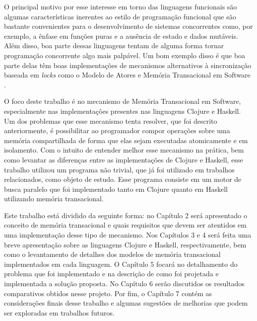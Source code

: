 O principal motivo por esse interesse em torno das linguagens funcionais são algumas características inerentes ao estilo de programação funcional que são bastante convenientes para o desenvolvimento de sistemas concorrentes como, por exemplo, a ênfase em funções puras e a ausência de estado e dados mutáveis. Além disso, boa parte dessas linguagens tentam de alguma forma tornar programação concorrente algo mais palpável. Um bom exemplo disso é que boa parte delas têm boas implementações de mecanismos alternativos à sincronização baseada em \emph{locks} como o Modelo de Atores \cite{agha1986actors} e Memória Transacional em Software \cite{shavit1995software}.

O foco deste trabalho é no mecanismo de Memória Transacional em Software, especialmente nas implementações presentes nas linguagens Clojure e Haskell. Um dos problemas que esse mecanismo  tenta resolver, que foi descrito anteriormente, é possibilitar ao programador compor operações sobre uma memória compartilhada de forma que elas sejam executadas atomicamente e em isolamento. Com o intuito de entender melhor esse mecanismo na prática, bem como levantar as diferenças entre as implementações de Clojure e Haskell, esse trabalho utilizou um programa não trivial, que já foi utilizado em trabalhos relacionados, como objeto de estudo. Esse programa consiste em um motor de busca paralelo que foi implementado tanto em Clojure quanto em Haskell utilizando memória transacional. 

Este trabalho está dividido da seguinte forma: no Capítulo 2 será apresentado o conceito de memória transacional e quais requisitos que devem ser atentidos em uma implementação desse tipo de mecanismo. Nos Capítulos 3 e 4 será feita uma breve apresentação sobre as linguagens Clojure e Haskell, respectivamente, bem como o levantamento de detalhes dos modelos de memória transacional implementados em cada linguagem. O Capítulo 5 focará no detalhamento do problema que foi implementado e na descrição de como foi projetada e implementada a solução proposta. No Capítulo 6 serão discutidos os resultados comparativos obtidos nesse projeto. Por fim, o Capítulo 7 contém as considerações finais desse trabalho e algumas sugestões de melhorias que podem ser exploradas em trabalhos futuros.
